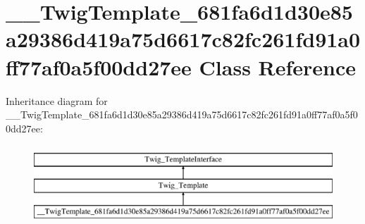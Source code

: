\hypertarget{class_____twig_template__681fa6d1d30e85a29386d419a75d6617c82fc261fd91a0ff77af0a5f00dd27ee}{}\section{\+\_\+\+\_\+\+Twig\+Template\+\_\+681fa6d1d30e85a29386d419a75d6617c82fc261fd91a0ff77af0a5f00dd27ee Class Reference}
\label{class_____twig_template__681fa6d1d30e85a29386d419a75d6617c82fc261fd91a0ff77af0a5f00dd27ee}
Inheritance diagram for \+\_\+\+\_\+\+Twig\+Template\+\_\+681fa6d1d30e85a29386d419a75d6617c82fc261fd91a0ff77af0a5f00dd27ee\+:\begin{figure}[H]
\begin{center}
\leavevmode
\includegraphics[height=3.000000cm]{class_____twig_template__681fa6d1d30e85a29386d419a75d6617c82fc261fd91a0ff77af0a5f00dd27ee}
\end{center}
\end{figure}
